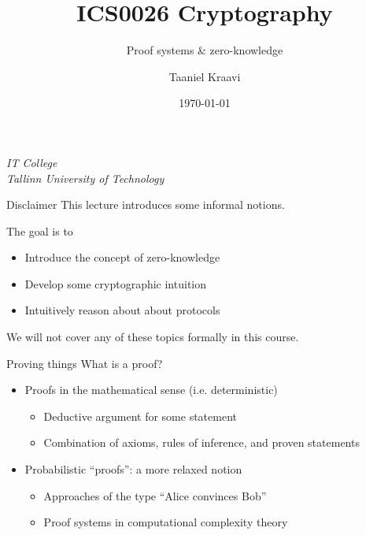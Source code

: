 \graphicspath{ {../../images/} }

\title{ICS0026 Cryptography}
\subtitle{Proof systems \& zero-knowledge}
\date{\today}
\author{Taaniel Kraavi}
\institute%
{%
  \textit{IT College}\\
  \textit{Tallinn University of Technology}
}


\begin{frame}
  \titlepage
\end{frame}

\begin{frame}{Disclaimer}
  \pause
  This lecture introduces some informal notions.

  \pause
  The goal is to
  \begin{itemize}[<+(1)->]
    \item Introduce the concept of zero-knowledge
    \item Develop some cryptographic intuition
    \item Intuitively reason about about protocols
  \end{itemize}

  \vfill

  \pause
  We will not cover any of these topics formally in this course.
\end{frame}

\begin{frame}{Proving things}
  What is a proof?
  \begin{itemize}[<+(1)->]
    \item Proofs in the mathematical sense (i.e. deterministic)
    \begin{itemize}
      \item Deductive argument for some statement
      \item Combination of axioms, rules of inference, and proven statements
    \end{itemize}
    \item Probabilistic \enquote{proofs}: a more relaxed notion
    \begin{itemize}
      \item Approaches of the type \enquote{Alice convinces Bob}
      \item Proof systems in computational complexity theory
    \end{itemize}
  \end{itemize}
\end{frame}

